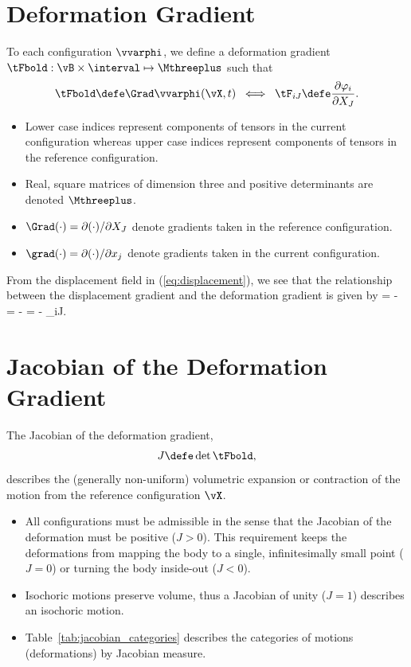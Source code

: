 \section{Deformation Gradient}
To each configuration $\vvarphi$, we define a deformation gradient 
$\tFbold: \vB \times \interval \mapsto \Mthreeplus$ 
such that
\begin{equation}
\tFbold 
\defe 
\Grad \vvarphi(\vX, t)
\;\; \Longleftrightarrow \;\;
\tF_{iJ} 
\defe 
\frac{\partial \varphi_i}{\partial X_J}.
\label{eq:deformation_gradient}
\end{equation}
\begin{Hremark}
\begin{itemize}
\item Lower case indices represent components of tensors in the
current configuration whereas upper case indices represent
components of tensors in the reference configuration.  
\item Real, square matrices of dimension three and positive determinants
are denoted $\Mthreeplus$.  
\item $\Grad(\cdot) = \partial (\cdot) / \partial X_J$ denote
gradients taken in the reference configuration.
\item $\grad(\cdot) = \partial (\cdot) / \partial x_j$ denote
gradients taken in the current configuration. 
\end{itemize}
\end{Hremark}

From the displacement field in 
(\ref{eq:displacement}), we see that 
the relationship between the displacement gradient and the 
deformation gradient is given by
\be
\Grad \vu = \Grad \vvarphi - \vid = \tFbold - \vid
\;\; \Longleftrightarrow \;\;
\dst{} = 
\dst{} - 
\delta_{iJ}.
\label{eq:Gradu}
\ee

\section{Jacobian of the Deformation Gradient}
The Jacobian of the deformation gradient, 
\begin{equation}
 J \defe \det \tFbold,
\end{equation}
describes the (generally non-uniform) volumetric expansion or 
contraction of the motion from the reference configuration $\vX$.

\begin{Hremark}
\begin{itemize}
\item All configurations must be admissible in the sense that the Jacobian
of the deformation must be positive ($J > 0$).
This requirement keeps the deformations from mapping the body to
a single, infinitesimally small point ($J=0$) or turning the
body inside-out ($J<0$).  
\item Isochoric motions preserve volume, thus a Jacobian
of unity ($J=1$) describes an isochoric motion.
\item Table~\ref{tab:jacobian_categories} describes the categories
of motions (deformations) by Jacobian measure.  
\end{itemize}
\end{Hremark}

